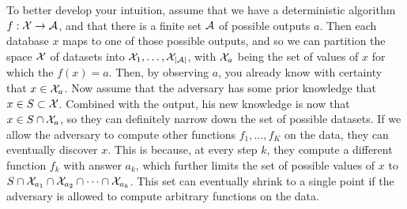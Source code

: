 \begin{frame}
{    \begin{example}
      To better develop your intuition, assume that we have a
      deterministic algorithm $f : {\mathcal{X}} \to {\mathcal{A}}$, and that there is a
      finite set ${\mathcal{A}}$ of possible outputs $a$. Then each database $x$
      maps to one of those possible outputs, and so we can partition
      the space ${\mathcal{X}}$ of datasets into ${\mathcal{X}}_1, \ldots, {\mathcal{X}}_{|{\mathcal{A}}|}$,
      with ${\mathcal{X}}_a$ being the set of values of $x$ for which the
      $f(x) = a$. Then, by observing $a$, you already know with
      certainty that $x \in {\mathcal{X}}_a$. Now assume that the adversary has
      some prior knowledge that $x \in S \subset {\mathcal{X}}$. Combined with
      the output, his new knowledge is now that $x \in S \cap {\mathcal{X}}_a$,
      so they can definitely narrow down the set of possible
      datasets. If we allow the adversary to compute other functions
      $f_1, \ldots, f_K$ on the data, they can eventually discover
      $x$. This is because, at every step $k$, they compute a
      different function $f_k$ with answer $a_k$, which further limits
      the set of possible values of $x$ to
      $S \cap {\mathcal{X}}_{a_1} \cap {\mathcal{X}}_{a_2} \cap \cdots \cap
      {\mathcal{X}}_{a_k}$. This set can eventually shrink to a single point if
      the adversary is allowed to compute arbitrary functions on the
      data.
    \end{example}
    }
\end{frame}

